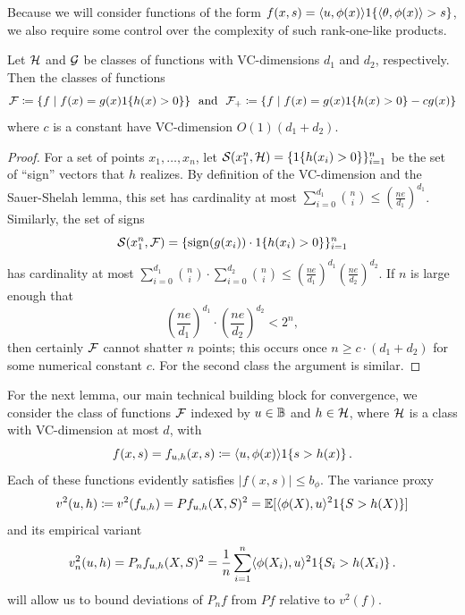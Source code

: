 \documentclass{article}
\newcommand{\radphi}{b_{\phi}}
\newcommand{\scorefunc}{s}
\newcommand{\scoreval}{\scorefunc}
\newcommand{\scorerv}{S}
\begin{document}
Because we will consider functions of the form $f(x, \scoreval) = \<u,
\phi(x)\> \indic{\<\theta, \phi(x)\> > \scoreval}$, we also require
some control over the complexity of such rank-one-like products.
\begin{lemma}
  \label{lemma:product-vc}
  Let $\mathcal{H}$ and $\mathcal{G}$ be classes of functions with
  VC-dimensions $d_1$ and $d_2$, respectively. Then
  the classes of functions
  \begin{equation*}
    \mathcal{F} \coloneqq \{f \mid f(x) = g(x) 1\!\left\{h(x) > 0\right\}\}
    ~~ \mbox{and} ~~
    \mathcal{F}_+ \coloneqq \{f \mid f(x) = g(x) 1\!\left\{h(x) > 0\right\} - c g(x)\}
  \end{equation*}
  where $c$ is a constant
  have VC-dimension $O(1)(d_1 + d_2)$.
\end{lemma}
\begin{proof}
  For a set of points $x_1, \ldots, x_n$, let $\mathcal{S}(x_1^n, \mathcal{H}) =
  \{1\!\left\{h(x_i) > 0\right\}\}_{i = 1}^n$ be the set of ``sign'' vectors that $h$
  realizes.
  By definition of the VC-dimension and the Sauer-Shelah lemma, this set has
  cardinality at most $\sum_{i = 0}^{d_1} \binom{n}{i} \le
  (\frac{ne}{d_1})^{d_1}$.
  Similarly, the set of signs
  \begin{equation*}
    \mathcal{S}(x_1^n, \mathcal{F})
    = \{\mathop{\rm sign}(g(x_i)) \cdot 1\!\left\{h(x_i) > 0\right\}\}_{i = 1}^n
  \end{equation*}
  has cardinality at most $\sum_{i = 0}^{d_1} \binom{n}{i} \cdot \sum_{i =
    0}^{d_2} \binom{n}{i} \le (\frac{ne}{d_1})^{d_1}
  (\frac{ne}{d_2})^{d_2}$.
  If $n$ is large enough that
  \begin{equation*}
    \left(\frac{ne}{d_1}\right)^{d_1} \cdot \left(\frac{ne}{d_2}\right)^{d_2}
    < 2^n,
  \end{equation*}
  then certainly $\mathcal{F}$ cannot shatter $n$ points; this occurs
  once $n \ge c \cdot (d_1 + d_2)$ for some numerical constant $c$.
  For the second class the argument is similar.
\end{proof}

\newcommand{\rademacher}{\mathfrak{R}}

For the next lemma, our main technical building block for convergence, we
consider the class of functions $\mathcal{F}$ indexed by $u \in \mathbb{B}$ and $h \in
\mathcal{H}$, where $\mathcal{H}$ is a class with VC-dimension at most $d$,
with
\begin{equation}
  \label{eqn:product-function-class}
  f(x, \scoreval) = f_{u,h}(x, \scoreval)
  \defeq \<u, \phi(x)\> \indic{\scoreval > h(x)}.
\end{equation}
Each of these functions evidently satisfies
$|f(x, \scoreval)| \le \radphi$.
%
The variance proxy
\begin{equation}
  \label{eqn:variance-proxy}
  v^2(u, h) \defeq v^2(f_{u,h}) = P f_{u, h}(X, \scorerv)^2
  = \E[\<\phi(X), u\>^2 \indic{\scorerv > h(X)}]
\end{equation}
and its empirical variant
\begin{equation*}
  v_n^2(u, h) = P_n f_{u,h}(X, \scorerv)^2
  = \frac{1}{n} \sum_{i = 1}^n \<\phi(X_i), u\>^2 \indic{\scorerv_i > h(X_i)}.
\end{equation*}
will allow us to bound deviations of $P_n f$ from $P f$ relative
to $v^2(f)$.
\end{document}
